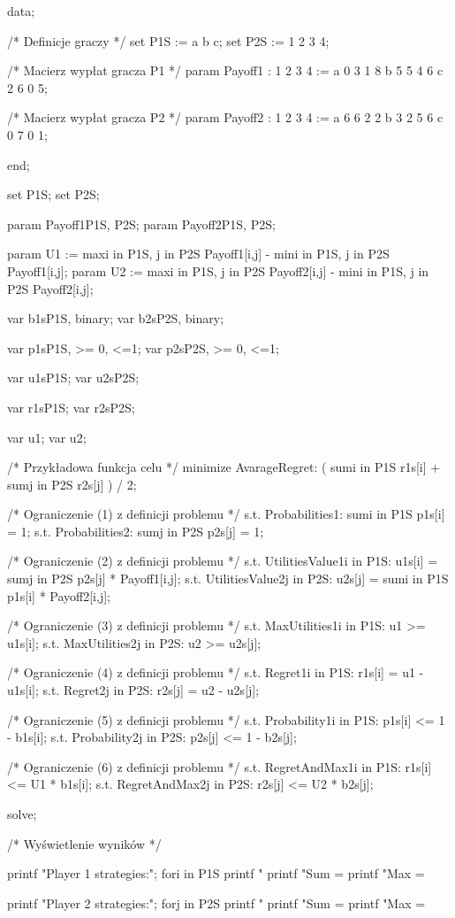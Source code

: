 \documentclass[polish]{standalone}
\begin{document}
\begin{code}[caption=Przykładowe dane]
data;

/* Definicje graczy */
set P1S := a b c;
set P2S := 1 2 3 4;

/* Macierz wypłat gracza P1 */
param Payoff1
    :  1  2  3  4 :=
    a  0  3  1  8
    b  5  5  4  6
    c  2  6  0  5;

/* Macierz wypłat gracza P2 */
param Payoff2
    :  1  2  3  4 :=
    a  6  6  2  2
    b  3  2  5  6
    c  0  7  0  1;
 
end;
\end{code}

\begin{code}[caption=Szukanie rozwiązania]
set P1S;
set P2S;

param Payoff1{P1S, P2S};
param Payoff2{P1S, P2S};

param U1 := max{i in P1S, j in P2S}
  Payoff1[i,j] - min{i in P1S, j in P2S} Payoff1[i,j];
param U2 := max{i in P1S, j in P2S}
  Payoff2[i,j] - min{i in P1S, j in P2S} Payoff2[i,j];

var b1s{P1S}, binary;
var b2s{P2S}, binary;

var p1s{P1S}, >= 0, <=1;
var p2s{P2S}, >= 0, <=1;

var u1s{P1S};
var u2s{P2S};

var r1s{P1S};
var r2s{P2S};

var u1;
var u2;

/* Przykładowa funkcja celu */
minimize AvarageRegret:
  ( sum{i in P1S} r1s[i] + sum{j in P2S} r2s[j] ) / 2;

/* Ograniczenie (1) z definicji problemu */
s.t. Probabilities1:
	sum{i in P1S} p1s[i] = 1;
s.t. Probabilities2:
	sum{j in P2S} p2s[j] = 1;

/* Ograniczenie (2) z definicji problemu */
s.t. UtilitiesValue1{i in P1S}:
	u1s[i] = sum{j in P2S} p2s[j] * Payoff1[i,j];
s.t. UtilitiesValue2{j in P2S}:
	u2s[j] = sum{i in P1S} p1s[i] * Payoff2[i,j];

/* Ograniczenie (3) z definicji problemu */
s.t. MaxUtilities1{i in P1S}:
	u1 >= u1s[i];
s.t. MaxUtilities2{j in P2S}:
	u2 >= u2s[j];

/* Ograniczenie (4) z definicji problemu */
s.t. Regret1{i in P1S}:
	r1s[i] = u1 - u1s[i];
s.t. Regret2{j in P2S}:
	r2s[j] = u2 - u2s[j];

/* Ograniczenie (5) z definicji problemu */
s.t. Probability1{i in P1S}:
	p1s[i] <= 1 - b1s[i];
s.t. Probability2{j in P2S}:
	p2s[j] <= 1 - b2s[j];

/* Ograniczenie (6) z definicji problemu */
s.t. RegretAndMax1{i in P1S}:
	r1s[i] <= U1 * b1s[i];
s.t. RegretAndMax2{j in P2S}:
	r2s[j] <= U2 * b2s[j];

solve;
 
/* Wyświetlenie wyników */ 

printf "Player 1 strategies:\n";
for{i in P1S}
	printf "%
printf "Sum = %
printf "Max = %
 
printf "Player 2 strategies:\n";
for{j in P2S}
	printf "%
printf "Sum = %
printf "Max = %
\end{code}
\end{document}
